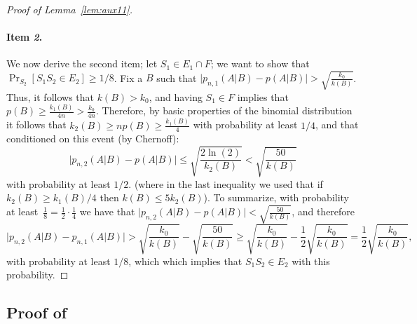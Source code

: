 \documentclass{article}
\begin{document}
\begin{proof}[Proof of Lemma~\ref{lem:aux11}]
\paragraph{Item {\it 2}.}
We now derive the second item;
let $S_1\in E_1\cap F$; we want to show that $\Pr_{S_2}[S_1S_2\in E_2]\geq 1/8$.
Fix a $B$ such that $\bigl\lvert p_{n,1}(A\vert B) - p(A\vert B) \bigr\rvert > \sqrt{\frac{k_0}{k(B)}}$.
Thus, it follows that $k(B) > k_0$, and having $S_1\in F$ implies that $p(B)\geq \frac{k_1(B)}{4n} > \frac{k_0}{4n}$.
Therefore, by basic properties of the binomial distribution it follows that $k_2(B) \geq np(B)\geq \frac{k_1(B)}{4}$ 
with probability at least $1/4$, and that conditioned on this event (by Chernoff):
\[ \bigl\lvert p_{n,2}(A \vert B) - p(A\vert B) \bigr\rvert \leq \sqrt{\frac{2\ln(2)}{k_2(B)}} < \sqrt{\frac{50}{k(B)}} \]
with probability at least $1/2$. 
(where in the last inequality we used that if $k_{2}(B)\geq k_1(B)/4$ then $k(B) \leq 5k_2(B)$).
To summarize, 
with probability at least~$\frac{1}{8}=\frac{1}{2}\cdot\frac{1}{4}$ we have that
$\bigl\lvert p_{n,2}(A \vert B) - p(A\vert B) \bigr\rvert < \sqrt{\frac{50}{k(B)}}$,
and therefore
\[
\bigl\lvert p_{n,2}(A \vert B) - p_{n,1}(A\vert B) \bigr\rvert > 
\sqrt{\frac{k_0}{k(B)}} - \sqrt{\frac{50}{k(B)}}\geq 
\sqrt{\frac{k_0}{k(B)}} - \frac{1}{2}\sqrt{\frac{k_0}{k(B)}}=
\frac{1}{2}\sqrt{\frac{k_0}{k(B)}},
\]
with probability at least $1/8$, which which implies that $S_1S_2\in E_2$ with this probability.
\end{proof}


\subsection{Proof of }
\end{document}
